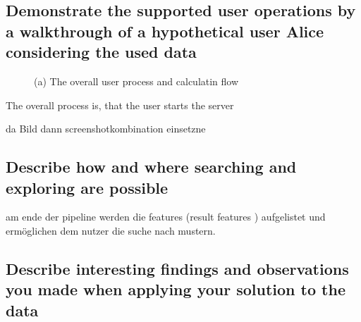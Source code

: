 \documentclass[runningheads]{llncs}
\begin{document}
\subsection{Demonstrate the supported user operations by a walkthrough of a hypothetical user Alice considering the used data}
\begin{figure}
    \centering
    \caption{(a) The overall user process and calculatin flow}
    \label{fig:metdata}
\end{figure}
The overall process is, that the user starts the server 



da Bild dann screenshotkombination einsetzne





\subsection{Describe how and where searching and exploring are possible}
am ende der pipeline werden die features (result features ) aufgelistet und ermöglichen dem nutzer die suche nach mustern.

\subsection{Describe interesting findings and observations you made when applying your solution to the data}
\end{document}
